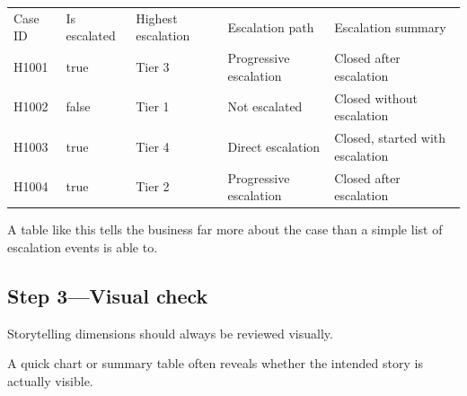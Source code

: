 \documentclass[10pt,openany,10pt]{book}
\newcounter{none}
\let\podeToprule\toprule
\let\podeMidrule\midrule
\let\podeBottomrule\bottomrule
\renewcommand{\toprule}{\arrayrulecolor{pbiGrid}\podeToprule}
\renewcommand{\midrule}{\arrayrulecolor{pbiGrid}\podeMidrule}
\renewcommand{\bottomrule}{\arrayrulecolor{pbiGrid}\podeBottomrule}
\begin{document}
{\def\LTcaptype{none} %
\begin{longtable}[]{@{}
  >{\raggedright\arraybackslash}p{}
  >{\raggedright\arraybackslash}p{}
  >{\raggedright\arraybackslash}p{}
  >{\raggedright\arraybackslash}p{}
  >{\raggedright\arraybackslash}p{}@{}}
\toprule\noalign{}
\begin{minipage}[b]{\linewidth}\raggedright
Case ID
\end{minipage} & \begin{minipage}[b]{\linewidth}\raggedright
Is escalated
\end{minipage} & \begin{minipage}[b]{\linewidth}\raggedright
Highest escalation
\end{minipage} & \begin{minipage}[b]{\linewidth}\raggedright
Escalation path
\end{minipage} & \begin{minipage}[b]{\linewidth}\raggedright
Escalation summary
\end{minipage} \\
\midrule\noalign{}
\endhead
\bottomrule\noalign{}
\endlastfoot
H1001 & true & Tier 3 & Progressive escalation & Closed after
escalation \\
H1002 & false & Tier 1 & Not escalated & Closed without escalation \\
H1003 & true & Tier 4 & Direct escalation & Closed, started with
escalation \\
H1004 & true & Tier 2 & Progressive escalation & Closed after
escalation \\
\end{longtable}
}

A table like this tells the business far more about the case than a
simple list of escalation events is able to.

\subsection{Step 3---Visual check}\label{step-3visual-check}

Storytelling dimensions should always be reviewed visually.

A quick chart or summary table often reveals whether the intended story
is actually visible.
\end{document}
